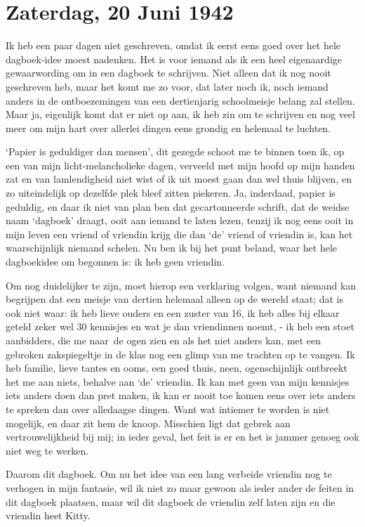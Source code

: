 \documentclass{book}
\begin{document}
\chapter{Zaterdag, 20 Juni 1942}

Ik heb een paar dagen niet geschreven, omdat ik eerst eens goed over het
hele dagboek-idee moest nadenken. Het is voor iemand als ik een heel
eigenaardige gewaarwording om in een dagboek te schrijven. Niet alleen
dat ik nog nooit geschreven heb, maar het komt me zo voor, dat later
noch ik, noch iemand anders in de ontboezemingen van een dertienjarig
schoolmeisje belang zal stellen. Maar ja, eigenlijk komt dat er niet op
aan, ik heb zin om te schrijven en nog veel meer om mijn hart over
allerlei dingen eens grondig en helemaal te luchten.

`Papier is geduldiger dan mensen', dit gezegde schoot me te binnen toen
ik, op een van mijn licht-melancholieke dagen, verveeld met mijn hoofd
op mijn handen zat en van lamlendigheid niet wist of ik uit moest gaan
dan wel thuis blijven, en zo uiteindelijk op dezelfde plek bleef zitten
piekeren. Ja, inderdaad, papier is geduldig, en daar ik niet van plan
ben dat gecartonneerde schrift, dat de weidse naam `dagboek' draagt,
ooit aan iemand te laten lezen, tenzij ik nog eens ooit in mijn leven
een vriend of vriendin krijg die dan `de' vriend of vriendin is, kan het
waarschijnlijk niemand schelen. Nu ben ik bij het punt beland, waar het
hele dagboekidee om begonnen is: ik heb geen vriendin.

Om nog duidelijker te zijn, moet hierop een verklaring volgen, want
niemand kan begrijpen dat een meisje van dertien helemaal alleen op de
wereld staat; dat is ook niet waar: ik heb lieve ouders en een zuster
van 16, ik heb alles bij elkaar geteld zeker wel 30 kennisjes en wat je
dan vriendinnen noemt, - ik heb een stoet aanbidders, die me naar~de
ogen zien en als het niet anders kan, met een gebroken zakspiegeltje in
de klas nog een glimp van me trachten op te vangen. Ik heb familie,
lieve tantes en ooms, een goed thuis, neen, ogenschijnlijk ontbreekt het
me aan niets, behalve aan `de' vriendin. Ik kan met geen van mijn
kennisjes iets anders doen dan pret maken, ik kan er nooit toe komen
eens over iets anders te spreken dan over alledaagse dingen. Want wat
intiemer te worden is niet mogelijk, en daar zit hem de knoop. Misschien
ligt dat gebrek aan vertrouwelijkheid bij mij; in ieder geval, het feit
is er en het is jammer genoeg ook niet weg te werken.

Daarom dit dagboek. Om nu het idee van een lang verbeide vriendin nog te
verhogen in mijn fantasie, wil ik niet zo maar gewoon als ieder ander de
feiten in dit dagboek plaatsen, maar wil dit dagboek de vriendin zelf
laten zijn en die vriendin heet Kitty.
\end{document}
